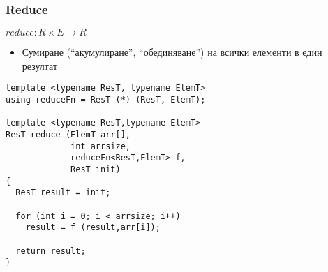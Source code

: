\documentclass{beamer}
\begin{document}
\begin{frame}[fragile]
\frametitle{Reduce}

\begin{center}
$reduce: R \times E \rightarrow R$
\end{center}

\begin{itemize}
  \item Сумиране (``акумулиране'', ``обединяване'') на всички елементи в един резултат
\end{itemize}

\begin{flushleft}
\begin{lstlisting}
template <typename ResT, typename ElemT>
using reduceFn = ResT (*) (ResT, ElemT);

template <typename ResT,typename ElemT>
ResT reduce (ElemT arr[], 
             int arrsize, 
             reduceFn<ResT,ElemT> f, 
             ResT init)
{
  ResT result = init;

  for (int i = 0; i < arrsize; i++)
    result = f (result,arr[i]);

  return result;
}
\end{lstlisting}  
\end{flushleft}

  
\end{frame}
\end{document}
